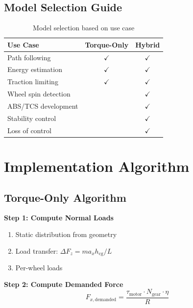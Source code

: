 \documentclass[11pt,a4paper]{article}
\begin{document}
\subsection{Model Selection Guide}

\begin{table}[H]
\centering
\begin{tabular}{lcc}
\toprule
\textbf{Use Case} & \textbf{Torque-Only} & \textbf{Hybrid} \\
\midrule
Path following & $\checkmark$ & $\checkmark$ \\
Energy estimation & $\checkmark$ & $\checkmark$ \\
Traction limiting & $\checkmark$ & $\checkmark$ \\
Wheel spin detection & & $\checkmark$ \\
ABS/TCS development & & $\checkmark$ \\
Stability control & & $\checkmark$ \\
Loss of control & & $\checkmark$ \\
\bottomrule
\end{tabular}
\caption{Model selection based on use case}
\end{table}

\section{Implementation Algorithm}

\subsection{Torque-Only Algorithm}

\textbf{Step 1: Compute Normal Loads}
\begin{enumerate}
    \item Static distribution from geometry
    \item Load transfer: $\Delta F_z = m a_x h_{\text{cg}} / L$
    \item Per-wheel loads
\end{enumerate}

\textbf{Step 2: Compute Demanded Force}
\begin{equation}
F_{x,\text{demanded}} = \frac{\tau_{\text{motor}} \cdot N_{\text{gear}} \cdot \eta}{R}
\end{equation}
\end{document}
